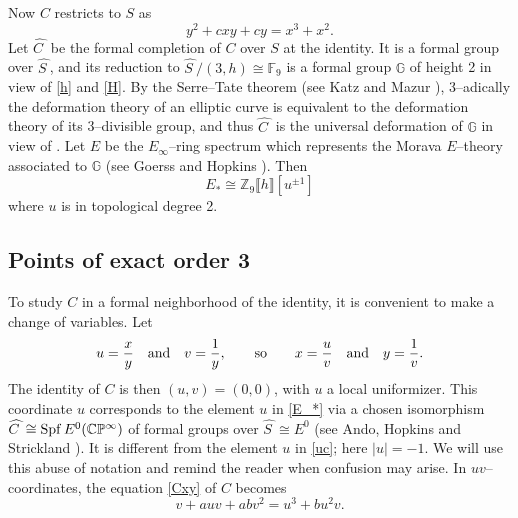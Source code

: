 \documentclass[microtype]{gtpart}     %
\theoremstyle{remark}
\theoremstyle{definition}
\newcommand{\mb}[1]{\mathbb{#1}}
\newcommand{\Spf}{{\rm Spf\thinspace}}
\newcommand{\BC}{{\mb C}}
\newcommand{\BF}{{\mb F}}
\newcommand{\BG}{{\mb G}}
\newcommand{\BP}{{\mb P}}
\newcommand{\BZ}{{\mb Z}}
\newcommand{\HC}{\widehat{C~}\!}
\newcommand{\HS}{\widehat{S~}\!}
\newcommand{\ad}{{\rm and}}
\begin{document}
Now $C$ restricts to $S$ as 
\begin{equation}
\label{Cc}
 y^2 + c x y + c y = x^3 + x^2.  
\end{equation}
Let $\HC$ be the formal completion of $C$ over $S$ at the identity.  It is a 
formal group over $\HS$, and its reduction to $\HS / (3,h) \cong \BF_9$ is a 
formal group $\BG$ of height 2 in view of \eqref{h} and \eqref{H}.  By the 
Serre--Tate theorem (see Katz and Mazur \cite[Theorem 2.9.1]{KM}), 
3--adically the deformation theory of an elliptic curve is equivalent to the 
deformation theory of its 3--divisible group, and thus $\HC$ is the universal 
deformation of $\BG$ in view of .  Let $E$ be the 
$E_\infty$--ring spectrum which represents the Morava $E$--theory associated 
to $\BG$ (see Goerss and Hopkins \cite[Corollary 7.6]{GH}).  Then 
\begin{equation}
\label{E_*}
 E_* \cong \BZ_9 \llbracket h \rrbracket [u^{\pm 1}] 
\end{equation}
where $u$ is in topological degree 2.  


\subsection{Points of exact order 3}

To study $C$ in a formal neighborhood of the identity, it is convenient to 
make a change of variables.  Let 
\[
 u = \frac{x}{y} \quad \ad \quad v = \frac{1}{y}, \qquad {\rm so} \qquad x = \frac{u}{v} \quad \ad \quad y = \frac{1}{v}.  
\]
The identity of $C$ is then $(u,v) = (0,0)$, with $u$ a local uniformizer.  
This coordinate $u$ corresponds to the element $u$ in \eqref{E_*} via a 
chosen isomorphism $\HC \cong \Spf E^0(\BC\BP^\infty)$ of formal groups over 
$\HS \cong E^0$ (see Ando, Hopkins and Strickland 
\cite[Definition 1.2]{cube}).  It is different from the element $u$ in 
\eqref{uc}; here $|u| = -1$.  We will use this abuse of notation and remind 
the reader when confusion may arise.  In $uv$--coordinates, the equation 
\eqref{Cxy} of $C$ becomes 
\begin{equation}
\label{Cuv}
 v + a u v + a b v^2 = u^3 + b u^2 v.  
\end{equation}
\end{document}
